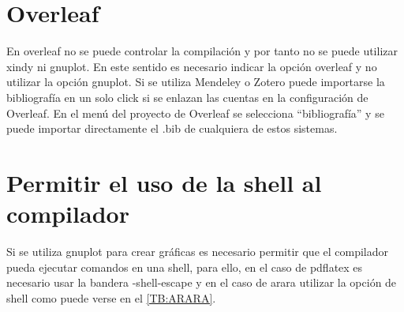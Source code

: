 \section{Overleaf}

En overleaf no se puede controlar la compilación y por tanto no se puede utilizar xindy ni gnuplot. En este sentido es necesario indicar la opción overleaf y no utilizar la opción gnuplot. Si se utiliza Mendeley o Zotero puede importarse la bibliografía en un solo click si se enlazan las cuentas en la configuración de Overleaf. En el menú del proyecto de Overleaf se selecciona ``bibliografía'' y se puede importar directamente el .bib de cualquiera de estos sistemas.

\section{Permitir el uso de la shell al compilador}

Si se utiliza gnuplot para crear gráficas es necesario permitir que el compilador pueda ejecutar comandos en una shell, para ello, en el caso de pdflatex es necesario usar la bandera -shell-escape y en el caso de arara utilizar la opción de shell como puede verse en el \cref{TB:ARARA}.
